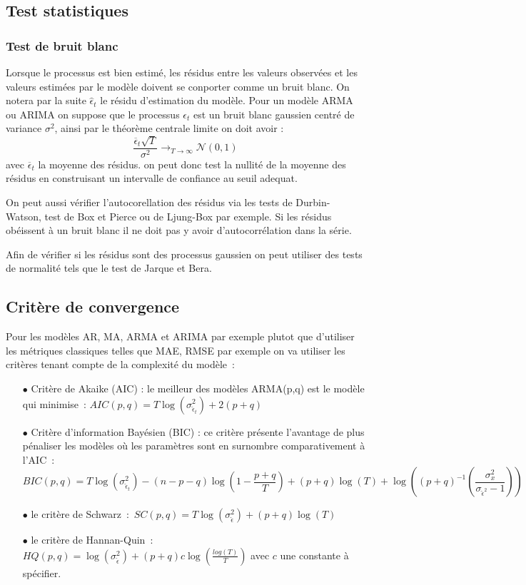 \documentclass[11pt]{scrartcl} %
\begin{document}
\subsection{Test statistiques}
\subsubsection{Test de bruit blanc}
Lorsque le processus est bien estimé, les résidus entre les valeurs observées et les valeurs estimées par le modèle doivent se conporter comme un bruit blanc. On notera par la suite $\hat{\epsilon}_t$ le résidu d'estimation du modèle. Pour un modèle ARMA ou ARIMA on suppose que le processus $\epsilon_t$ est un bruit blanc gaussien centré de variance $\sigma^2$, ainsi par le théorème centrale limite on doit avoir :
$$
\frac{\overline{\epsilon}_t\sqrt{T}}{\sigma^2}\rightarrow_{T\rightarrow\infty}\mathcal{N}(0,1)
$$
avec $\overline{\epsilon}_t$ la moyenne des résidus. on peut donc test la nullité de la moyenne des résidus en construisant un intervalle de confiance au seuil adequat.

On peut aussi vérifier l'autocorellation des résidus via les tests de Durbin-Watson, test de Box et Pierce ou de Ljung-Box par exemple. Si les résidus obéissent à un bruit blanc il ne doit pas y avoir d'autocorrélation dans la série.

Afin de vérifier si les résidus sont des processus gaussien on peut utiliser des tests de normalité tels que le test de Jarque et Bera.
\subsection{Critère de convergence}
Pour les modèles AR, MA, ARMA et ARIMA par exemple plutot que d'utiliser les métriques classiques telles que MAE, RMSE par exemple on va utiliser les critères tenant compte de la complexité du modèle~:
\begin{itemize}
\item[$\bullet$] Critère de Akaike (AIC) : le meilleur des modèles ARMA(p,q) est le modèle qui minimise~: $AIC(p,q)=T\log\left(\sigma_{\hat{\epsilon}_t}^2\right)+2(p+q)$\\
\item[$\bullet$] Critère d'information Bayésien (BIC) : ce critère présente l'avantage de plus pénaliser les modèles où les paramètres sont en surnombre comparativement à l'AIC~: $$BIC(p,q)=T\log\left(\sigma_{\hat{\epsilon}_t}^2\right)-(n-p-q)\log\left(1-\frac{p+q}{T}\right)+(p+q)\log(T)+\log\left((p+q)^{-1}\left(\frac{\sigma_x^2}{\sigma_{\hat{\epsilon}^2}-1}\right)\right)$$
\item[$\bullet$] le critère de Schwarz~:~$SC(p,q)=T\log\left(\sigma_{\hat{\epsilon}}^2\right)+(p+q)\log(T)$\\
\item[$\bullet$] le critère de Hannan-Quin~:~$HQ(p,q)=\log(\sigma_{\hat{\epsilon}}^2)+(p+q)c\log\left(\frac{log(T)}{T}\right)$ avec $c$ une constante à spécifier.
\end{itemize}

%

\end{document}
